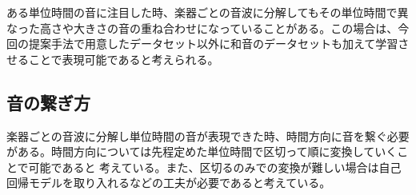 ある単位時間の音に注目した時、楽器ごとの音波に分解してもその単位時間で異なった高さや大きさの音の重ね合わせになっていることがある。この場合は、今回の提案手法で用意したデータセット以外に和音のデータセットも加えて学習させることで表現可能であると考えられる。

\subsection{音の繋ぎ方}


楽器ごとの音波に分解し単位時間の音が表現できた時、時間方向に音を繋ぐ必要がある。時間方向については先程定めた単位時間で区切って順に変換していくことで可能であると 考えている。また、区切るのみでの変換が難しい場合は自己回帰モデルを取り入れるなどの工夫が必要であると考えている。

